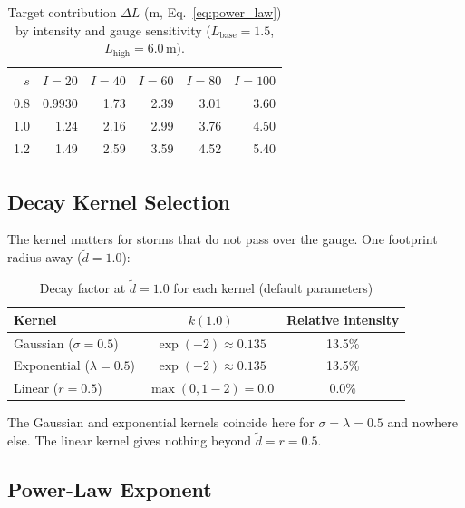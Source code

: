 \documentclass[11pt,a4paper]{article}
\begin{document}
\begin{table}[H]
    \centering
    \caption{Target contribution $\Delta L$ (m, Eq.~\ref{eq:power_law}) by intensity and gauge sensitivity ($L_{\text{base}}=1.5$, $L_{\text{high}}=6.0$\,m).}
    \label{tab:sens_intensity_level}
    \begin{tabular}{rrrrrr}
        \toprule
        \textbf{$s$} & \textbf{$I=20$} & \textbf{$I=40$} & \textbf{$I=60$} & \textbf{$I=80$} & \textbf{$I=100$} \\
        \midrule
        0.8 & 0.9930 & 1.73 & 2.39 & 3.01 & 3.60 \\
        1.0 & 1.24 & 2.16 & 2.99 & 3.76 & 4.50 \\
        1.2 & 1.49 & 2.59 & 3.59 & 4.52 & 5.40 \\
        \bottomrule
    \end{tabular}
\end{table}

\subsection{Decay Kernel Selection}

The kernel matters for storms that do not pass over the gauge. One footprint radius
away ($\tilde{d} = 1.0$):

\begin{table}[H]
    \centering
    \caption{Decay factor at $\tilde{d} = 1.0$ for each kernel (default parameters)}
    \label{tab:decay_comparison}
    \begin{tabular}{lcc}
        \toprule
        \textbf{Kernel} & \textbf{$k(1.0)$} & \textbf{Relative intensity} \\
        \midrule
        Gaussian ($\sigma = 0.5$) & $\exp(-2) \approx 0.135$ & 13.5\% \\
        Exponential ($\lambda = 0.5$) & $\exp(-2) \approx 0.135$ & 13.5\% \\
        Linear ($r = 0.5$) & $\max(0, 1-2) = 0.0$ & 0.0\% \\
        \bottomrule
    \end{tabular}
\end{table}

\noindent The Gaussian and exponential kernels coincide here for $\sigma = \lambda = 0.5$
and nowhere else. The linear kernel gives nothing beyond $\tilde{d} = r = 0.5$.

\subsection{Power-Law Exponent}
\end{document}
